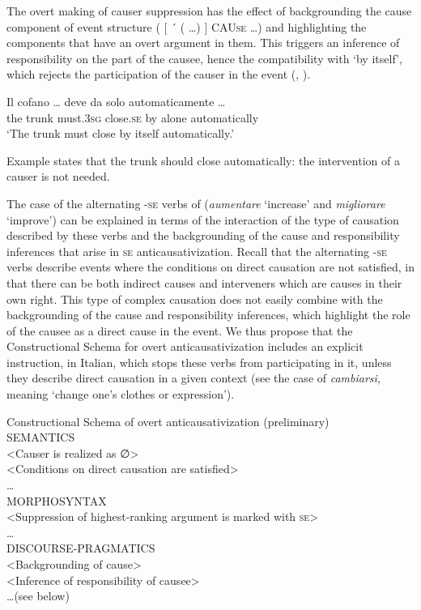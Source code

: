 \documentclass[output=paper,colorlinks,citecolor=brown
]{langscibook}
\begin{document}
The overt making of causer suppression has the effect of backgrounding the cause component of event structure ( $\lbrack$ ´ ( \ldots ) $\rbrack$ CAU\textsc{se} \ldots ) and highlighting the components that have an overt argument in them. This triggers an inference of responsibility on the part of the causee, hence the compatibility with ‘by itself’, which rejects the participation of the causer in the event (, ). 

\ea \label{bentley_example_53}
\gll Il		cofano  {\ldots} 		deve					 da		solo		automaticamente {\ldots } \\
	the	trunk	{}						must.3\textsc{sg}		close.\textsc{se}			by	alone	automatically \\
\glt ‘The trunk must close by itself automatically.’
\z

Example  states that the trunk should close automatically: the intervention of a causer is not needed. 

The case of the alternating -\textsc{se} verbs of  (\textit{aumentare} ‘increase’ and \textit{migliorare} ‘improve’) can be explained in terms of the interaction of the type of causation described by these verbs and the backgrounding of the cause and responsibility inferences that arise in \textsc{se} anticausativization. Recall that the alternating -\textsc{se} verbs describe events where the conditions on direct causation are not satisfied, in that there can be both indirect causes and interveners which are causes in their own right. This type of complex causation does not easily combine with the backgrounding of the cause and responsibility inferences, which highlight the role of the causee as a direct cause in the event. We thus propose that the Constructional Schema for overt anticausativization includes an explicit instruction, in Italian, which stops these verbs from participating in it, unless they describe direct causation in a given context (see the case of \textit{cambiarsi}, meaning ‘change one’s clothes or expression’).

\ea \label{bentley_example_54}
Constructional Schema of overt anticausativization (preliminary)\\
SEMANTICS\\
<Causer is realized as ∅>\\
<Conditions on direct causation are satisfied>\\
 \ldots \\
MORPHOSYNTAX\\
<Suppression of highest-ranking argument is marked with \textsc{se}>\\
 \ldots \\
DISCOURSE-PRAGMATICS\\
<Backgrounding of cause>\\
<Inference of responsibility of causee>\\
 \ldots  (see below)
\z
\end{document}

